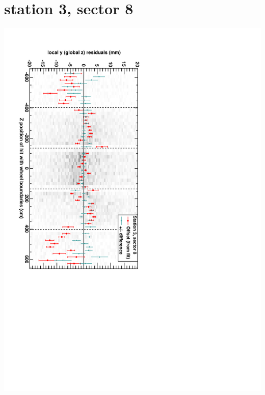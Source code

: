 \documentclass[compress]{beamer}
\begin{document}
\section*{station 3, sector 8}
\begin{frame} \vfill \mbox{\hspace{-1 cm}\includegraphics[height=1.2\linewidth, angle=90]{DTzVsZ_st3_sr08.pdf}} \end{frame}
\end{document}
